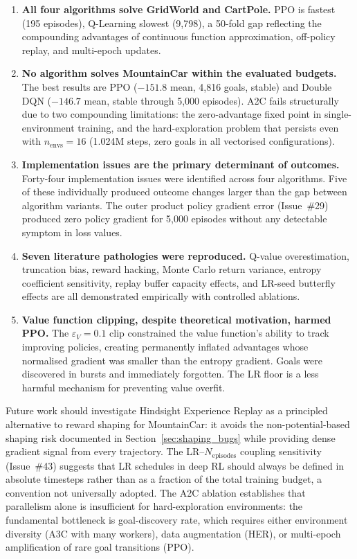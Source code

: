 \documentclass[a4paper,12pt]{article}
\begin{document}
\begin{enumerate}
  \item \textbf{All four algorithms solve GridWorld and CartPole.} PPO is fastest (195 episodes), Q-Learning slowest (9,798), a 50-fold gap reflecting the compounding advantages of continuous function approximation, off-policy replay, and multi-epoch updates.

  \item \textbf{No algorithm solves MountainCar within the evaluated budgets.} The best results are PPO ($-151.8$ mean, 4,816 goals, stable) and Double DQN ($-146.7$ mean, stable through 5,000 episodes). A2C fails structurally due to two compounding limitations: the zero-advantage fixed point in single-environment training, and the hard-exploration problem that persists even with $n_\text{envs}=16$ (1.024M steps, zero goals in all vectorised configurations).

  \item \textbf{Implementation issues are the primary determinant of outcomes.} Forty-four implementation issues were identified across four algorithms. Five of these individually produced outcome changes larger than the gap between algorithm variants. The outer product policy gradient error (Issue~\#29) produced zero policy gradient for 5,000 episodes without any detectable symptom in loss values.

  \item \textbf{Seven literature pathologies were reproduced.} Q-value overestimation, truncation bias, reward hacking, Monte Carlo return variance, entropy coefficient sensitivity, replay buffer capacity effects, and LR-seed butterfly effects are all demonstrated empirically with controlled ablations.

  \item \textbf{Value function clipping, despite theoretical motivation, harmed PPO.} The $\varepsilon_V=0.1$ clip constrained the value function's ability to track improving policies, creating permanently inflated advantages whose normalised gradient was smaller than the entropy gradient. Goals were discovered in bursts and immediately forgotten. The LR floor is a less harmful mechanism for preventing value overfit.
\end{enumerate}

Future work should investigate Hindsight Experience Replay as a principled alternative to reward shaping for MountainCar: it avoids the non-potential-based shaping risk documented in Section~\ref{sec:shaping_bugs} while providing dense gradient signal from every trajectory. The LR--$N_\text{episodes}$ coupling sensitivity (Issue~\#43) suggests that LR schedules in deep RL should always be defined in absolute timesteps rather than as a fraction of the total training budget, a convention not universally adopted. The A2C ablation establishes that parallelism alone is insufficient for hard-exploration environments: the fundamental bottleneck is goal-discovery rate, which requires either environment diversity (A3C with many workers), data augmentation (HER), or multi-epoch amplification of rare goal transitions (PPO).
\end{document}
